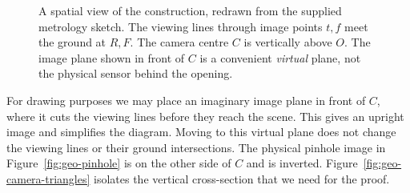 \begin{figure}[htbp]\centering
{}
\caption{A spatial view of the construction, redrawn from the supplied
metrology sketch. The viewing lines through image points $t,f$ meet the
ground at $R,F$. The camera centre $C$ is vertically above $O$.
The image plane shown in front of $C$ is a convenient \emph{virtual}
plane, not the physical sensor behind the opening.}
\label{fig:geo-camera-spatial}
\end{figure}

For drawing purposes we may place an imaginary image plane in front of
$C$, where it cuts the viewing lines before they reach the scene. This
gives an upright image and simplifies the diagram. Moving to this virtual
plane does not change the viewing lines or their ground intersections.
The physical pinhole image in Figure~\ref{fig:geo-pinhole} is on the other
side of $C$ and is inverted. Figure~\ref{fig:geo-camera-triangles} isolates
the vertical cross-section that we need for the proof.

